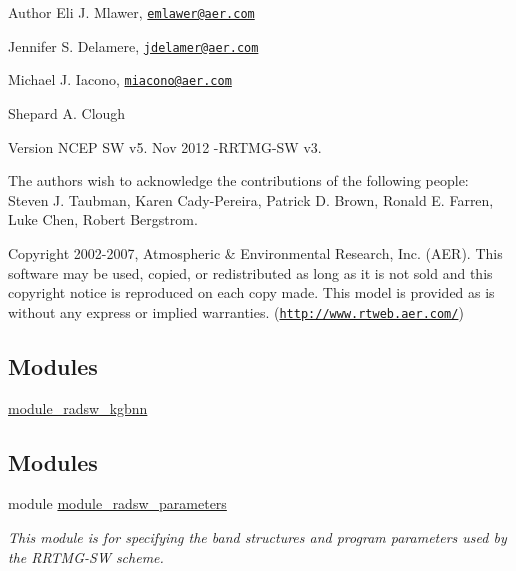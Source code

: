 \begin{DoxyAuthor}{Author}
Eli J. Mlawer, \href{mailto:emlawer@aer.com}{\tt emlawer@aer.\+com} 

Jennifer S. Delamere, \href{mailto:jdelamer@aer.com}{\tt jdelamer@aer.\+com} 

Michael J. Iacono, \href{mailto:miacono@aer.com}{\tt miacono@aer.\+com} 

Shepard A. Clough 
\end{DoxyAuthor}
\begin{DoxyVersion}{Version}
N\+C\+EP SW v5. Nov 2012 -\/\+R\+R\+T\+M\+G-\/\+SW v3.
\end{DoxyVersion}
The authors wish to acknowledge the contributions of the following people\+: Steven J. Taubman, Karen Cady-\/\+Pereira, Patrick D. Brown, Ronald E. Farren, Luke Chen, Robert Bergstrom.

\begin{DoxyCopyright}{Copyright}
2002-\/2007, Atmospheric \& Environmental Research, Inc. (A\+ER). This software may be used, copied, or redistributed as long as it is not sold and this copyright notice is reproduced on each copy made. This model is provided as is without any express or implied warranties. (\href{http://www.rtweb.aer.com/}{\tt http\+://www.\+rtweb.\+aer.\+com/}) 
\end{DoxyCopyright}
\subsection*{Modules}
\begin{DoxyCompactItemize}
\item 
\hyperlink{group__module__radsw__kgbnn}{module\+\_\+radsw\+\_\+kgbnn}
\end{DoxyCompactItemize}
\subsection*{Modules}
\begin{DoxyCompactItemize}
\item 
module \hyperlink{namespacemodule__radsw__parameters}{module\+\_\+radsw\+\_\+parameters}
\begin{DoxyCompactList}\small\item\em This module is for specifying the band structures and program parameters used by the R\+R\+T\+M\+G-\/\+SW scheme. \end{DoxyCompactList}\end{DoxyCompactItemize}
